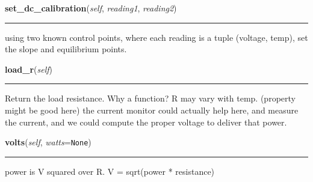     \label{tempcontrol:tcontroller:set_dc_calibration}

    \vspace{0.5ex}

    \begin{boxedminipage}{\textwidth}

    \raggedright \textbf{set\_dc\_calibration}(\textit{self}, \textit{reading1}, \textit{reading2})

    \vspace{-1.5ex}

    \rule{\textwidth}{0.5\fboxrule}
    using two known control points, where each reading is a tuple (voltage,
    temp), set the slope and equilibrium points.

    \vspace{1ex}

    \end{boxedminipage}

    \label{tempcontrol:tcontroller:load_r}

    \vspace{0.5ex}

    \begin{boxedminipage}{\textwidth}

    \raggedright \textbf{load\_r}(\textit{self})

    \vspace{-1.5ex}

    \rule{\textwidth}{0.5\fboxrule}
    Return the load resistance. Why a function? R may vary with temp. 
    (property might be good here) the current monitor could actually help 
    here, and measure the current, and we could compute the proper voltage 
    to deliver that power.

    \vspace{1ex}

    \end{boxedminipage}

    \label{tempcontrol:tcontroller:volts}

    \vspace{0.5ex}

    \begin{boxedminipage}{\textwidth}

    \raggedright \textbf{volts}(\textit{self}, \textit{watts}=\texttt{None})

    \vspace{-1.5ex}

    \rule{\textwidth}{0.5\fboxrule}
    power is V squared over R. V = sqrt(power * resistance)

    \vspace{1ex}

    \end{boxedminipage}

